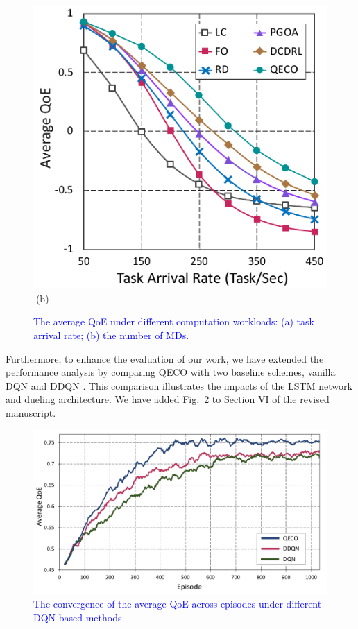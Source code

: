 \documentclass[12pt,draftclsnofoot,onecolumn]{IEEEtran}
\begin{document}
\begin{enumerate}
\begin{figure}[H]
\begin{minipage}[b]{0.3\linewidth}
		\includegraphics[width=\textwidth]{ qoe_1}
		\textcolor{white}{i}\hspace{0.6cm}(b)
	\end{minipage}
	
	\caption{\textcolor{blue}{The average QoE under different computation workloads: (a) task arrival rate; (b) the number of MDs.}}
	\label{chart44}
\end{figure} 

Furthermore, to enhance the evaluation of our work, we have extended the performance analysis by comparing QECO with two baseline schemes, vanilla DQN and DDQN \cite{van2016deep}. This comparison illustrates the impacts of the LSTM network and dueling architecture. We have added Fig.~\ref{chartC1} to Section VI of the revised manuscript.

\begin{figure}[H]
	\captionsetup{name=Fig.}
	\centering
	\includegraphics[width=.6\linewidth]{m1}
	\vspace*{-3mm}
	\caption{\textcolor{blue}{The convergence of the average QoE across episodes under different DQN-based methods.}}
	\vspace*{-3mm}
	\label{chartC1}
\end{figure}


\end{enumerate}
\end{document}
